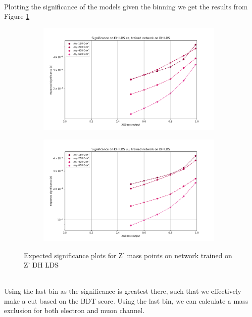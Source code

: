 \documentclass[12pt, a4paper]{book}
\begin{document}
\\Plotting the significance of the models given the binning we get the results from Figure \ref{fig:DH_LDS_exp_sig}
\begin{figure}[!ht]
	\centering
	\begin{subfigure}[b]{0.49\textwidth}
      \centering
      \includegraphics[width=1\textwidth]{XGBoost/DH_LDS/EXP_SIG_ee.pdf}
      \end{subfigure}
   \hfill
   \begin{subfigure}[b]{0.49\textwidth}
      \centering
      \includegraphics[width=1\textwidth]{XGBoost/DH_LDS/EXP_SIG_uu.pdf}
      \end{subfigure}
   \caption{Expected significance plots for Z' mass points on network trained on Z' DH LDS}\label{fig:DH_LDS_exp_sig}
\end{figure}
\\Using the last bin as the significance is greatest there, such that we effectively make a cut based on the BDT score. Using the last bin, we can calculate a mass exclusion for both electron and muon channel.\\
\end{document}
